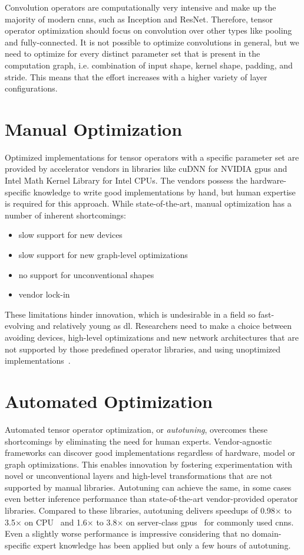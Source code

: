 Convolution operators are computationally very intensive and make up the majority of modern \glspl{cnn}, such as Inception\cite{Szegedy.2015} and ResNet\cite{He.2015}. Therefore, tensor operator optimization should focus on convolution over other types like pooling and fully-connected. It is not possible to optimize convolutions in general, but we need to optimize for every distinct parameter set that is present in the computation graph, i.e. combination of input shape, kernel shape, padding, and stride. This means that the effort increases with a higher variety of layer configurations.

\section{Manual Optimization}
Optimized implementations for tensor operators with a specific parameter set are provided by accelerator vendors in libraries like cuDNN for NVIDIA \glspl{gpu} and Intel Math Kernel Library for Intel CPUs. The vendors possess the hardware-specific knowledge to write good implementations by hand, but human expertise is required for this approach. While state-of-the-art, manual optimization has a number of inherent shortcomings:
\begin{itemize}
	\item slow support for new devices
	\item slow support for new graph-level optimizations
	\item no support for unconventional shapes
	\item vendor lock-in
\end{itemize}
These limitations hinder innovation, which is undesirable in a field so fast-evolving and relatively young as \gls{dl}. Researchers need to make a choice between avoiding devices, high-level optimizations and new network architectures that are not supported by those predefined operator libraries, and using unoptimized implementations~\cite[p.~1]{Chen.2018b}.

\section{Automated Optimization}
Automated tensor operator optimization, or \textit{autotuning}, overcomes these shortcomings by eliminating the need for human experts. Vendor-agnostic frameworks can discover good implementations regardless of hardware, model or graph optimizations. This enables innovation by fostering experimentation with novel or unconventional layers and high-level transformations that are not supported by manual libraries. Autotuning can achieve the same, in some cases even better inference performance than state-of-the-art vendor-provided operator libraries. Compared to these libraries, autotuning delivers speedups of 0.98× to 3.5× on CPU~\cite[p.~9]{Liu.2019} and 1.6× to 3.8× on server-class \glspl{gpu}~\cite[p.~10]{Chen.2018b} for commonly used \glspl{cnn}. Even a slightly worse performance is impressive considering that no domain-specific expert knowledge has been applied but only a few hours of autotuning.

